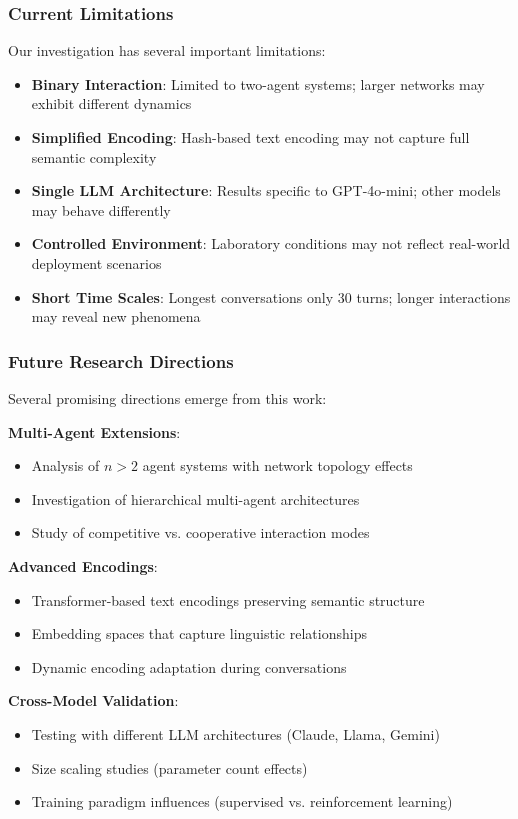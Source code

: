 \documentclass[11pt,a4paper]{article}
\begin{document}
\subsubsection{Current Limitations}

Our investigation has several important limitations:

\begin{itemize}
    \item \textbf{Binary Interaction}: Limited to two-agent systems; larger networks may exhibit different dynamics
    \item \textbf{Simplified Encoding}: Hash-based text encoding may not capture full semantic complexity
    \item \textbf{Single LLM Architecture}: Results specific to GPT-4o-mini; other models may behave differently
    \item \textbf{Controlled Environment}: Laboratory conditions may not reflect real-world deployment scenarios
    \item \textbf{Short Time Scales}: Longest conversations only 30 turns; longer interactions may reveal new phenomena
\end{itemize}

\subsubsection{Future Research Directions}

Several promising directions emerge from this work:

\textbf{Multi-Agent Extensions}:
\begin{itemize}
    \item Analysis of $n > 2$ agent systems with network topology effects
    \item Investigation of hierarchical multi-agent architectures
    \item Study of competitive vs. cooperative interaction modes
\end{itemize}

\textbf{Advanced Encodings}:
\begin{itemize}
    \item Transformer-based text encodings preserving semantic structure
    \item Embedding spaces that capture linguistic relationships
    \item Dynamic encoding adaptation during conversations
\end{itemize}

\textbf{Cross-Model Validation}:
\begin{itemize}
    \item Testing with different LLM architectures (Claude, Llama, Gemini)
    \item Size scaling studies (parameter count effects)
    \item Training paradigm influences (supervised vs. reinforcement learning)
\end{itemize}
\end{document}
